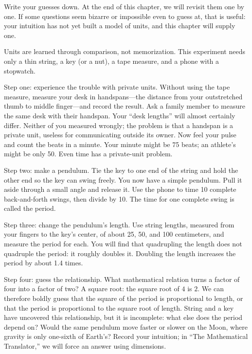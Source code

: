 Write your guesses down. At the end of this chapter, we will revisit them one by one. If some questions seem bizarre or impossible even to guess at, that is useful: your intuition has not yet built a model of units, and this chapter will supply one.


Units are learned through comparison, not memorization. This experiment needs only a thin string, a key (or a nut), a tape measure, and a phone with a stopwatch.

\begin{experiment}
Step one: experience the trouble with private units. Without using the tape measure, measure your desk in handspans---the distance from your outstretched thumb to middle finger---and record the result. Ask a family member to measure the same desk with their handspan. Your ``desk lengths'' will almost certainly differ. Neither of you measured wrongly; the problem is that a handspan is a private unit, useless for communicating outside its owner. Now feel your pulse and count the beats in a minute. Your minute might be 75 beats; an athlete's might be only 50. Even time has a private-unit problem.

Step two: make a pendulum. Tie the key to one end of the string and hold the other end so the key can swing freely. You now have a simple pendulum. Pull it aside through a small angle and release it. Use the phone to time 10 complete back-and-forth swings, then divide by 10. The time for one complete swing is called the period.

Step three: change the pendulum's length. Use string lengths, measured from your fingers to the key's center, of about 25, 50, and 100 centimeters, and measure the period for each. You will find that quadrupling the length does not quadruple the period: it roughly doubles it. Doubling the length increases the period by about 1.4 times.

Step four: guess the relationship. What mathematical relation turns a factor of four into a factor of two? A square root: the square root of $4$ is $2$. We can therefore boldly guess that the square of the period is proportional to length, or that the period is proportional to the square root of length. String and a key have uncovered this relationship, but it is incomplete: what else does the period depend on? Would the same pendulum move faster or slower on the Moon, where gravity is only one-sixth of Earth's? Record your intuition; in ``The Mathematical Translator,'' we will force an answer using dimensions.


\end{experiment}
